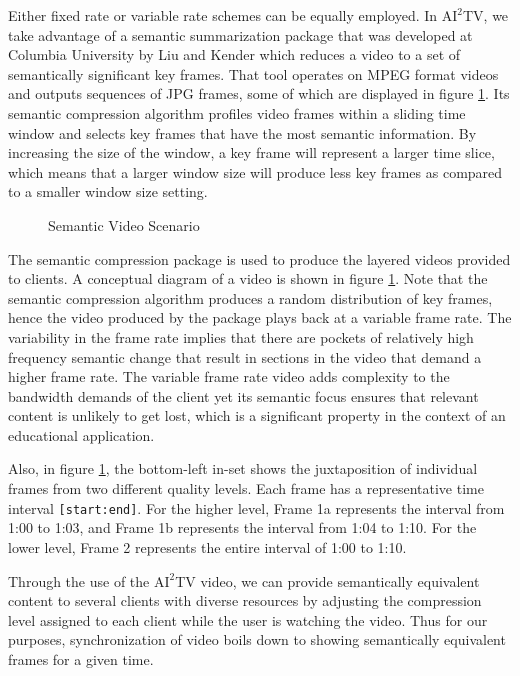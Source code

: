 \documentclass{sig-alternate}
\begin{document}
Either fixed rate or variable rate schemes can be equally employed. In
$\mathrm{AI}^2$TV, we take advantage of a semantic summarization
package that was developed at Columbia University by Liu and Kender
\cite{TIECHENG} which reduces a video to a set of semantically
significant key frames.  That tool operates on MPEG format videos and
outputs sequences of JPG frames, some of which are displayed in figure
\ref{sem_video}.  Its semantic compression algorithm profiles video
frames within a sliding time window and selects key frames that have
the most semantic information.  By increasing the size of the window,
a key frame will represent a larger time slice, which means that a
larger window size will produce less key frames as compared to a
smaller window size setting.

\begin{figure}
  \centering
  \caption{Semantic Video Scenario}
  \label{sem_video}
\end{figure} 

The semantic compression package is used to produce the layered videos
provided to clients.  A conceptual diagram of a video is shown in
figure \ref{sem_video}.  Note that the semantic compression algorithm
produces a random distribution of key frames, hence the video produced
by the package plays back at a variable frame rate.  The variability
in the frame rate implies that there are pockets of relatively high
frequency semantic change that result in sections in the video that
demand a higher frame rate.  The variable frame rate video adds
complexity to the bandwidth demands of the client yet its semantic
focus ensures that relevant content is unlikely to get lost, which is
a significant property in the context of an educational application.

Also, in figure \ref{sem_video}, the bottom-left in-set shows the
juxtaposition of individual frames from two different quality levels.
Each frame has a representative time interval \texttt{[start:end]}.
For the higher level, Frame 1a represents the interval from 1:00 to
1:03, and Frame 1b represents the interval from 1:04 to 1:10.  For the
lower level, Frame 2 represents the entire interval of 1:00 to 1:10.

Through the use of the $\mathrm{AI}^2$TV video, we can provide
semantically equivalent content to several clients with diverse
resources by adjusting the compression level assigned to each client
while the user is watching the video.  Thus for our purposes,
synchronization of video boils down to showing semantically equivalent
frames for a given time.
\end{document}
